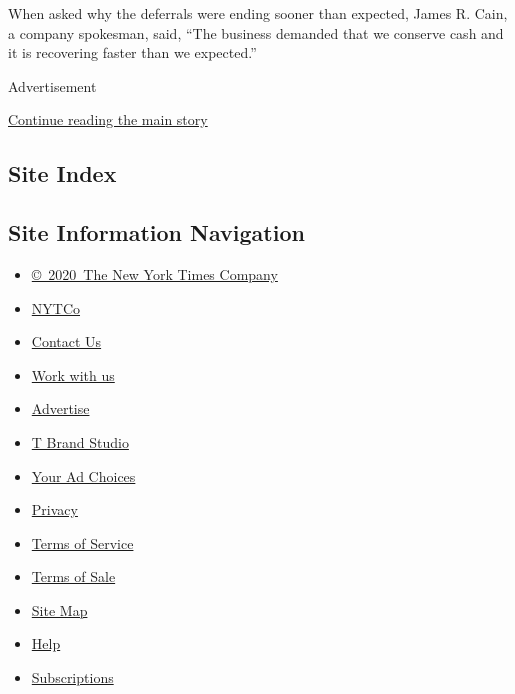 When asked why the deferrals were ending sooner than expected, James R.
Cain, a company spokesman, said, ``The business demanded that we
conserve cash and it is recovering faster than we expected.''

Advertisement

\protect\hyperlink{after-bottom}{Continue reading the main story}

\hypertarget{site-index}{%
\subsection{Site Index}\label{site-index}}

\hypertarget{site-information-navigation}{%
\subsection{Site Information
Navigation}\label{site-information-navigation}}

\begin{itemize}
\tightlist
\item
  \href{https://help.nytimes3xbfgragh.onion/hc/en-us/articles/115014792127-Copyright-notice}{©~2020~The
  New York Times Company}
\end{itemize}

\begin{itemize}
\tightlist
\item
  \href{https://www.nytco.com/}{NYTCo}
\item
  \href{https://help.nytimes3xbfgragh.onion/hc/en-us/articles/115015385887-Contact-Us}{Contact
  Us}
\item
  \href{https://www.nytco.com/careers/}{Work with us}
\item
  \href{https://nytmediakit.com/}{Advertise}
\item
  \href{http://www.tbrandstudio.com/}{T Brand Studio}
\item
  \href{https://www.nytimes3xbfgragh.onion/privacy/cookie-policy\#how-do-i-manage-trackers}{Your
  Ad Choices}
\item
  \href{https://www.nytimes3xbfgragh.onion/privacy}{Privacy}
\item
  \href{https://help.nytimes3xbfgragh.onion/hc/en-us/articles/115014893428-Terms-of-service}{Terms
  of Service}
\item
  \href{https://help.nytimes3xbfgragh.onion/hc/en-us/articles/115014893968-Terms-of-sale}{Terms
  of Sale}
\item
  \href{https://spiderbites.nytimes3xbfgragh.onion}{Site Map}
\item
  \href{https://help.nytimes3xbfgragh.onion/hc/en-us}{Help}
\item
  \href{https://www.nytimes3xbfgragh.onion/subscription?campaignId=37WXW}{Subscriptions}
\end{itemize}
